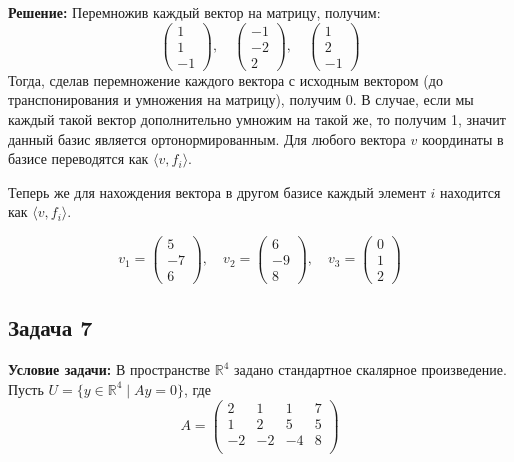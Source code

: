 \documentclass[a4paper,12pt]{article}
\begin{document}
\textbf{Решение:}
Перемножив каждый вектор на матрицу, получим:
\[
\begin{pmatrix}
1 \\ 1 \\ -1
\end{pmatrix}, \quad
\begin{pmatrix}
-1 \\ -2 \\ 2
\end{pmatrix}, \quad
\begin{pmatrix}
1 \\ 2 \\ -1
\end{pmatrix}
\]
Тогда, сделав перемножение каждого вектора с исходным вектором (до транспонирования и умножения на матрицу), получим 0. В случае, если мы каждый такой вектор дополнительно умножим на такой же, то получим 1, значит данный базис является ортонормированным. Для любого вектора $v$ координаты в базисе переводятся как $\langle v, f_i \rangle$.

Теперь же для нахождения вектора в другом базисе каждый элемент $i$ находится как $\langle v, f_i \rangle$.

\[
v_1 = \begin{pmatrix}
5 \\ -7 \\ 6
\end{pmatrix}, \quad
v_2 = \begin{pmatrix}
6 \\ -9 \\ 8
\end{pmatrix}, \quad
v_3 = \begin{pmatrix}
0 \\ 1 \\ 2
\end{pmatrix}
\]

\vspace{1cm}

\subsection{Задача 7}
\textbf{Условие задачи:} В пространстве $\mathbb{R}^4$ задано стандартное скалярное произведение. Пусть $U = \{y \in \mathbb{R}^4 \mid Ay = 0\}$, где 
\[
A = \begin{pmatrix}
2 & 1 & 1 & 7 \\
1 & 2 & 5 & 5 \\
-2 & -2 & -4 & 8 \\
\end{pmatrix}
\]
\end{document}
